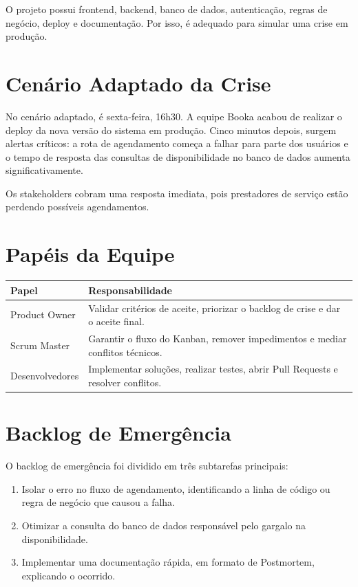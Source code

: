 \documentclass[12pt,a4paper]{article}
\begin{document}
O projeto possui frontend, backend, banco de dados, autenticação, regras de negócio, deploy e documentação. Por isso, é adequado para simular uma crise em produção.

\section{Cenário Adaptado da Crise}

No cenário adaptado, é sexta-feira, 16h30. A equipe Booka acabou de realizar o deploy da nova versão do sistema em produção. Cinco minutos depois, surgem alertas críticos: a rota de agendamento começa a falhar para parte dos usuários e o tempo de resposta das consultas de disponibilidade no banco de dados aumenta significativamente.

Os stakeholders cobram uma resposta imediata, pois prestadores de serviço estão perdendo possíveis agendamentos.

\section{Papéis da Equipe}

\begin{longtable}{|p{4cm}|p{10cm}|}
\hline
\textbf{Papel} & \textbf{Responsabilidade} \\ \hline
Product Owner & Validar critérios de aceite, priorizar o backlog de crise e dar o aceite final. \\ \hline
Scrum Master & Garantir o fluxo do Kanban, remover impedimentos e mediar conflitos técnicos. \\ \hline
Desenvolvedores & Implementar soluções, realizar testes, abrir Pull Requests e resolver conflitos. \\ \hline
\end{longtable}

\section{Backlog de Emergência}

O backlog de emergência foi dividido em três subtarefas principais:

\begin{enumerate}
    \item Isolar o erro no fluxo de agendamento, identificando a linha de código ou regra de negócio que causou a falha.
    \item Otimizar a consulta do banco de dados responsável pelo gargalo na disponibilidade.
    \item Implementar uma documentação rápida, em formato de Postmortem, explicando o ocorrido.
\end{enumerate}
\end{document}
